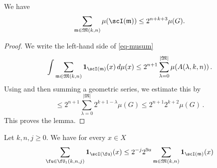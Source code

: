 \begin{lemma}
\label{top-tiles}
\leanok
{}
    We have
    \begin{equation}\label{eq-musum}
        \sum_{\mathfrak{m} \in \mathfrak{M}(k,n)} \mu(\scI(\mathfrak{m}))\le 2^{n+k+3}\mu(G).
    \end{equation}
\end{lemma}
\begin{proof}
We write the left-hand side of \eqref{eq-musum}
\begin{equation}
    \int \sum_{\mathfrak{m} \in \mathfrak{M}(k,n)} \mathbf{1}_{\scI(\mathfrak{m})}(x) \, d\mu(x) \le
2^{n+1} \sum_{\lambda=0}^{|\mathfrak{M}|}\mu(A(\lambda, k,n))\,.
\end{equation}
Using 
and then summing a geometric series, we estimate this by
\begin{equation}
    \le
2^{n+1}\sum_{\lambda=0}^{|\mathfrak{M}|}
2^{k+1-\lambda}\mu(G)
\le
2^{n+1}2^{k+2}\mu(G)\, .
\end{equation}
This proves the lemma.
\end{proof}


\begin{lemma}
\label{tree-count}
\leanok
{}
Let $k,n,j\ge 0$. We have for every $x\in X$
\begin{equation}
    \sum_{\fu\in \fU_1(k,n,j)} \mathbf{1}_{\scI(\fu)}(x)
    \le 2^{-j}
    2^{9a} \sum_{\mathfrak{m}\in \mathfrak{M}(k,n)}
     \mathbf{1}_{\scI(\mathfrak{m})}(x)
\end{equation}
\end{lemma}

